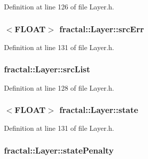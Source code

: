 Definition at line 126 of file Layer.\+h.

\hypertarget{classfractal_1_1Layer_a1b0dd6aba3bd642fd8d60914d070779d}{
\subsubsection[{src\+Err}]{$<${\bf F\+L\+O\+A\+T}$>$ fractal\+::\+Layer\+::src\+Err\hspace{0.3cm}{\ttfamily [protected]}}}\label{classfractal_1_1Layer_a1b0dd6aba3bd642fd8d60914d070779d}


Definition at line 131 of file Layer.\+h.

\hypertarget{classfractal_1_1Layer_a9f497e9df823d1c65558e24a7ea2993e}{
\subsubsection[{src\+List}]{ fractal\+::\+Layer\+::src\+List\hspace{0.3cm}{\ttfamily [protected]}}}\label{classfractal_1_1Layer_a9f497e9df823d1c65558e24a7ea2993e}


Definition at line 128 of file Layer.\+h.

\hypertarget{classfractal_1_1Layer_a1d9a52b5c715cd8d769f36ed9136e1d3}{
\subsubsection[{state}]{$<${\bf F\+L\+O\+A\+T}$>$ fractal\+::\+Layer\+::state\hspace{0.3cm}{\ttfamily [protected]}}}\label{classfractal_1_1Layer_a1d9a52b5c715cd8d769f36ed9136e1d3}


Definition at line 131 of file Layer.\+h.

\hypertarget{classfractal_1_1Layer_a2d9020e0da1993e16d9fcd9b86b94d91}{
\subsubsection[{state\+Penalty}]{ fractal\+::\+Layer\+::state\+Penalty\hspace{0.3cm}{\ttfamily [protected]}}}\label{classfractal_1_1Layer_a2d9020e0da1993e16d9fcd9b86b94d91}


